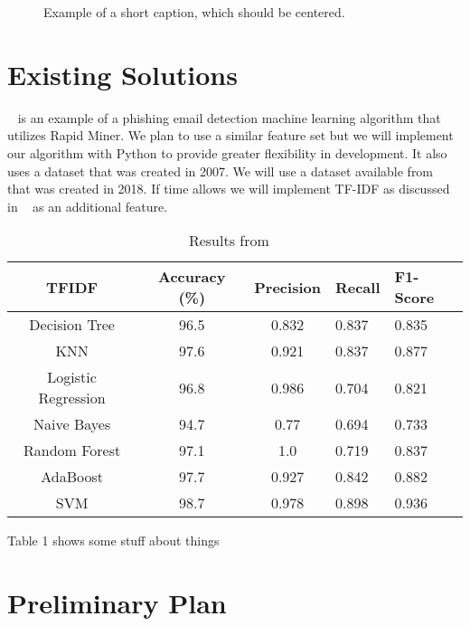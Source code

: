 \documentclass[10pt,twocolumn,letterpaper]{article}
\begin{document}
\begin{figure*}
\begin{center}
\fbox{\rule{0pt}{2in} \rule{.9\linewidth}{0pt}}
\end{center}
   \caption{Example of a short caption, which should be centered.}
\label{fig:short}
\end{figure*}

\section{Existing Solutions}

~\cite{diego} is an example of a phishing email detection machine learning algorithm that utilizes Rapid Miner. We plan to use a similar feature set but we will implement our algorithm with Python to provide greater flexibility in development. It also uses a dataset that was created in 2007. We will use a dataset available from ~\cite{monkey} that was created in 2018. If time allows we will implement TF-IDF as discussed in ~\cite{CENreport} as an additional feature.

\pagebreak

\begin{table}
\begin{center}
\begin{tabular}{|c|c|c|l|l|}
\hline
TFIDF & Accuracy (\%) & Precision & Recall & F1-Score\\
\hline
Decision Tree & 96.5 & 0.832 & 0.837 & 0.835\\
\hline
KNN & 97.6 & 0.921 & 0.837 & 0.877\\
\hline
Logistic Regression & 96.8 & 0.986 & 0.704 & 0.821\\
\hline
Naive Bayes & 94.7 & 0.77 & 0.694 & 0.733\\
\hline
Random Forest& 97.1 & 1.0 & 0.719 & 0.837\\
\hline
AdaBoost & 97.7 & 0.927 & 0.842 & 0.882\\
\hline
SVM & 98.7 & 0.978 & 0.898 & 0.936\\
\hline
\end{tabular}
\end{center}
\caption{Results from ~\cite{CENreport}}
\end{table}

Table 1 shows some stuff about things

\section{Preliminary Plan}
\end{document}
